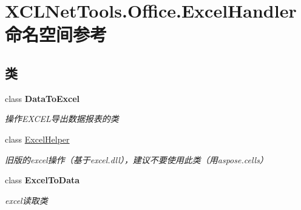 \hypertarget{namespace_x_c_l_net_tools_1_1_office_1_1_excel_handler}{}\section{X\+C\+L\+Net\+Tools.\+Office.\+Excel\+Handler 命名空间参考}
\label{namespace_x_c_l_net_tools_1_1_office_1_1_excel_handler}
\subsection*{类}
\begin{DoxyCompactItemize}
\item 
class {\bfseries Data\+To\+Excel}
\begin{DoxyCompactList}\small\item\em 操作\+E\+X\+C\+E\+L导出数据报表的类 \end{DoxyCompactList}\item 
class \hyperlink{class_x_c_l_net_tools_1_1_office_1_1_excel_handler_1_1_excel_helper}{Excel\+Helper}
\begin{DoxyCompactList}\small\item\em 旧版的excel操作（基于excel.\+dll），建议不要使用此类（用aspose.\+cells） \end{DoxyCompactList}\item 
class {\bfseries Excel\+To\+Data}
\begin{DoxyCompactList}\small\item\em excel读取类 \end{DoxyCompactList}\end{DoxyCompactItemize}
